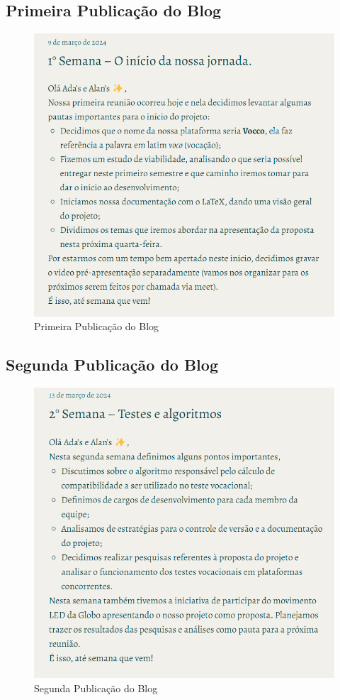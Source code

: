\begin{apendicesenv}
\subsection*{Primeira Publicação do Blog}
\begin{figure}[H]
    \centering
    \includegraphics[width=1.0\linewidth]{images/Post1.png}
    \caption{Primeira Publicação do Blog}
    \label{fig:primeira}
\end{figure}

\subsection*{Segunda Publicação do Blog}
\begin{figure}[H]
    \centering
    \includegraphics[width=1.0\linewidth]{images/Post2.png}
    \caption{Segunda Publicação do Blog}
    \label{fig:segunda}
\end{figure}


\end{apendicesenv}

